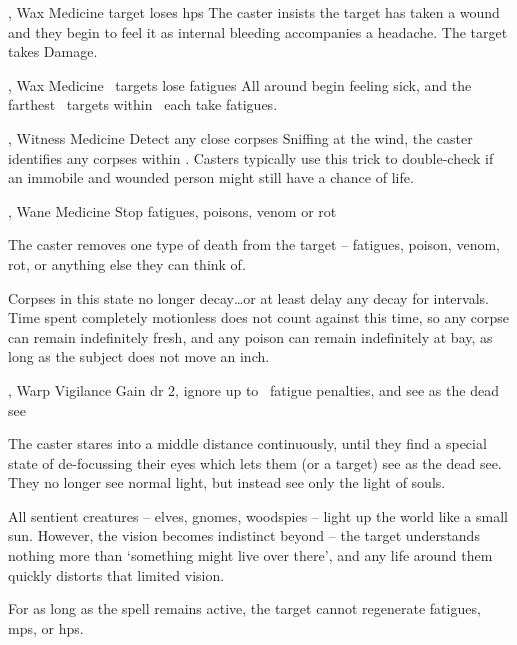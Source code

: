   {\mFate, \mAir}%
  {Wax}%
  {\detailed}%
  {Medicine}%
  {target loses  \glspl{hp}}%
  {
    The caster insists the target has taken a wound and they begin to feel it as internal bleeding accompanies a headache.
    The target takes  Damage.
  }

  {\mFate, \mAir}%
  {Wax}%
  {\duplicated}%
  {Medicine}%
  {\spellArea\ targets lose  \glspl{fatigue}}%
  {
    All around begin feeling sick, and the farthest \spellArea\ targets within \spellRange\ each take  \glspl{fatigue}.
  }

  {\mFate, \mAir}%
  {Witness}%
  {\distant}%
  {Medicine}%
  {Detect any close corpses}%
  {
    Sniffing at the wind, the caster identifies any corpses within \spellRange.
    Casters typically use this trick to double-check if an immobile and wounded person might still have a chance of life.
  }

  {\mFate, \mAir}%
  {Wane}%
  {\detailed}%
  {Medicine}%
  {Stop \glspl{fatigue}, poisons, venom or rot}%
  {
    The caster removes one type of death from the target -- \glspl{fatigue}, poison, venom, rot, or anything else they can think of.

    Corpses in this state no longer decay\ldots or at least delay any decay for  \glspl{interval}. 
    Time spent completely motionless does not count against this time, so any corpse can remain indefinitely fresh, and any poison can remain indefinitely at bay, as long as the subject does not move an inch.
  }

  {\mFate, \mAir}%
  {Warp}%
  {\detailed}%
  {Vigilance}%
  {Gain \gls{dr} 2, ignore up to ~\gls{fatigue} penalties, and see as the dead see}%
  {
    The caster stares into a middle distance continuously, until they find a special state of de-focussing their eyes which lets them (or a target) see as the dead see.
    They no longer see normal light, but instead see only the light of souls.

    All sentient creatures -- elves, gnomes, woodspies -- light up the world like a small sun.
    However, the vision becomes indistinct beyond \spellRange -- the target understands nothing more than `something might live over there', and any life around them quickly distorts that limited vision.

    For as long as the spell remains active, the target cannot regenerate \glspl{fatigue}, \glspl{mp}, or \glspl{hp}.
  }

